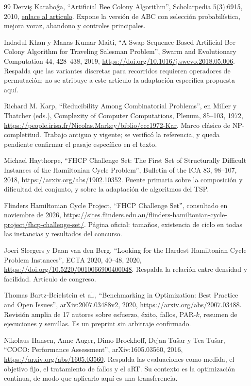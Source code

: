 \begin{thebibliography}{99}
Derviş Karaboğa, ``Artificial Bee Colony Algorithm'', Scholarpedia 5(3):6915, 2010, \href{https://www.scholarpedia.org/article/Artificial_bee_colony_algorithm}{enlace al artículo}. Expone la versión de ABC con selección probabilística, mejora voraz, abandono y controles principales.

Indadul Khan y Manas Kumar Maiti, ``A Swap Sequence Based Artificial Bee Colony Algorithm for Traveling Salesman Problem'', Swarm and Evolutionary Computation 44, 428--438, 2019, \url{https://doi.org/10.1016/j.swevo.2018.05.006}. Respalda que las variantes discretas para recorridos requieren operadores de permutación; no se atribuye a este artículo la adaptación específica propuesta aquí.

Richard M. Karp, ``Reducibility Among Combinatorial Problems'', en Miller y Thatcher (eds.), Complexity of Computer Computations, Plenum, 85--103, 1972, \url{https://people.irisa.fr/Nicolas.Markey/biblio/ccc1972-Kar}. Marco clásico de NP-completitud. Trabajo antiguo y vigente; se verificó la referencia, y queda pendiente confirmar el pasaje específico en el texto.

Michael Haythorpe, ``FHCP Challenge Set: The First Set of Structurally Difficult Instances of the Hamiltonian Cycle Problem'', Bulletin of the ICA 83, 98--107, 2018, \url{https://arxiv.org/abs/1902.10352}. Fuente primaria sobre la composición y dificultad del conjunto, y sobre la adaptación de algoritmos del TSP.

Flinders Hamiltonian Cycle Project, ``FHCP Challenge Set'', consultado en noviembre de 2026, \url{https://sites.flinders.edu.au/flinders-hamiltonian-cycle-project/fhcp-challenge-set/}. Página oficial: tamaños, existencia de ciclo en todas las instancias y resultados del concurso.

Joeri Sleegers y Daan van den Berg, ``Looking for the Hardest Hamiltonian Cycle Problem Instances'', ECTA 2020, 40--48, 2020, \url{https://doi.org/10.5220/0010066900400048}. Respalda la relación entre densidad y facilidad. Artículo de congreso.

Thomas Bartz-Beielstein et al., ``Benchmarking in Optimization: Best Practice and Open Issues'', arXiv:2007.03488v2, 2020, \url{https://arxiv.org/abs/2007.03488}. Revisión amplia de 17 autores sobre esfuerzo, éxito, fallos, PAR-$k$, resumen de ejecuciones y semillas. Es un preprint sin arbitraje confirmado.

Nikolaus Hansen, Anne Auger, Dimo Brockhoff, Dejan Tušar y Tea Tušar, ``COCO: Performance Assessment'', arXiv:1605.03560, 2016, \url{https://arxiv.org/abs/1605.03560}. Respalda las evaluaciones como medida, el objetivo fijo, el tratamiento de fallos y el aRT. Su contexto es la optimización continua, de modo que aplicarlo aquí es una transferencia.


\end{thebibliography}
